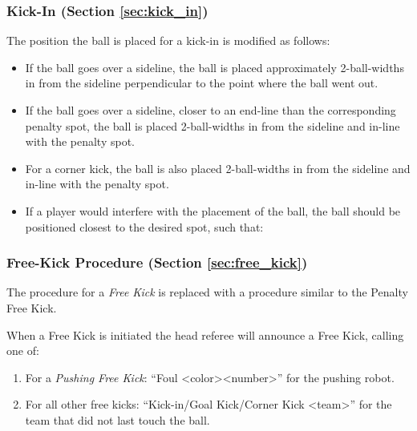 \subsubsection{Kick-In (Section \ref{sec:kick_in})}

The position the ball is placed for a kick-in is modified as follows:
\begin{itemize}
    \item If the ball goes over a sideline, the ball is placed approximately 2-ball-widths in from the sideline perpendicular to the point where the ball went out.
    \item If the ball goes over a sideline, closer to an end-line than the corresponding penalty spot, the ball is placed 2-ball-widths in from the sideline and in-line with the penalty spot.
    \item For a corner kick, the ball is also placed 2-ball-widths in from the sideline and in-line with the penalty spot.
    \item If a player would interfere with the placement of the ball, the ball should be positioned closest to the desired spot, such that:
\end{itemize}

\subsubsection{Free-Kick Procedure (Section \ref{sec:free_kick})}

The procedure for a \emph{Free Kick} is replaced with a procedure similar to the Penalty Free Kick.

When a Free Kick is initiated the head referee will announce a Free Kick, calling one of:
\begin{enumerate}
  \item For a \textit{Pushing Free Kick}: ``Foul \textless color\textgreater \textless number\textgreater'' for the pushing robot.
  \item For all other free kicks: ``Kick-in/Goal Kick/Corner Kick \textless team\textgreater'' for the team that did not last touch the ball.
\end{enumerate}

